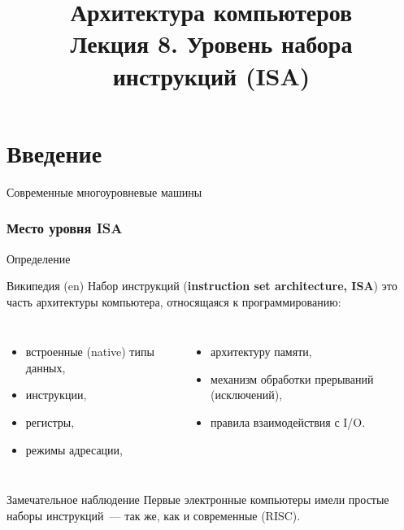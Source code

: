 \newcommand{\h}{%
handout,%
}



\title[Уровень набора инструкций]%
    {Архитектура компьютеров\texorpdfstring{\\}{ }%
    Лекция 8. Уровень набора инструкций (ISA)}



\begin{frame}
\titlepage
\end{frame}

\section{Введение}

\begin{frame}{Современные многоуровневые машины}
\centering

\end{frame}

\begin{frame}
\frametitle{Место уровня ISA}
\end{frame}


\begin{frame}{Определение}

\pause
\begin{block}{Википедия (en)}
Набор инструкций (\textbf{instruction set architecture, ISA}) это часть архитектуры компьютера, \alert{относящаяся к программированию}:
\begin{columns}
    \column{6cm}
\begin{itemize}
    \item встроенные (native) типы данных,
    \item инструкции,
    \item регистры,
    \item режимы адресации,
\end{itemize}
    \column{6cm}
\begin{itemize}
    \item архитектуру памяти,
    \item механизм обработки прерываний (исключений),
    \item правила взаимодействия с I/O.
\end{itemize}
\end{columns}
\end{block}

\pause
\begin{block}{Замечательное наблюдение}
Первые электронные компьютеры имели простые наборы инструкций~— так же, как и современные (\alert{RISC}).
\end{block}
\end{frame}

